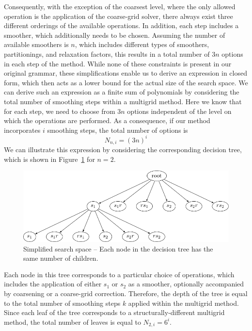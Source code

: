 Consequently, with the exception of the coarsest level, where the only allowed operation is the application of the coarse-grid solver, there always exist three different orderings of the available operations.
In addition, each step includes a smoother, which additionally needs to be chosen.
Assuming the number of available smoothers is $n$, which includes different types of smoothers, partitionings, and relaxation factors, this results in a total number of $3 n$ options in each step of the method.
While none of these constraints is present in our original grammar, these simplifications enable us to derive an expression in closed form, which then acts as a lower bound for the actual size of the search space.
We can derive such an expression as a finite sum of polynomials by considering the total number of smoothing steps within a multigrid method.
Here we know that for each step, we need to choose from $3 n$ options independent of the level on which the operations are performed.
As a consequence, if our method incorporates $i$ smoothing steps, the total number of options is 
\begin{equation}\tag{4.9}
	N_{n,i} = (3 n)^i
	\label{eq:simplified-number-of-options}
\end{equation}
We can illustrate this expression by considering the corresponding decision tree, which is shown in Figure~\ref{fig:decision-tree} for $n = 2$.
\begin{figure}
	\centering
	\includegraphics[width=\textwidth]{figures/trees/decision_tree.pdf}
	\caption[Simplified search space]{Simplified search space -- Each node in the decision tree has the same number of children.}
	\label{fig:decision-tree}
\end{figure}
Each node in this tree corresponds to a particular choice of operations, which includes the application of either $s_1$ or $s_2$ as a smoother, optionally accompanied by coarsening or a coarse-grid correction.
Therefore, the depth of the tree is equal to the total number of smoothing steps $k$ applied within the multigrid method.
Since each leaf of the tree corresponds to a structurally-different multigrid method, the total number of leaves is equal to $N_{2,i} = 6^i$.
